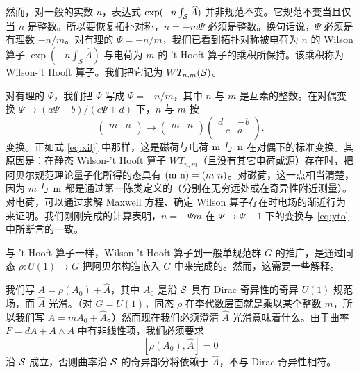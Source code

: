 然而，对一般的实数 $n$，表达式 $\exp(-n\int_{{\cal S}} \hat A)$ 并非规范不变。它规范不变当且仅当 $n$ 是整数。所以要恢复拓扑对称，$n=-m\Psi$ 必须是整数。换句话说，$\Psi$ 必须是有理数 $-n/m$。对有理的 $\Psi=-n/m$，我们已看到拓扑对称被电荷为 $n$ 的 Wilson 算子 $\exp(-n\int_S \hat A)$ 与电荷为 $m$ 的 't Hooft 算子的乘积所保持。该乘积称为 Wilson-'t Hooft 算子。我们把它记为 $WT_{n,m}({{\cal S}})$。

对有理的 $\Psi$，我们把 $\Psi$ 写成 $\Psi=-n/m$，其中 $n$ 与 $m$ 是互素的整数。在对偶变换 $\Psi\to (a\Psi+b)/(c\Psi+d)$ 下，$n$ 与 $m$ 按
\begin{equation*}
\tag*{(6.17)}
\left(\begin{matrix} m  & n \\\end{matrix}\right)\to  \left(\begin{matrix} m &
n\\\end{matrix}\right) \left(\begin{matrix} d & -b\\ -c & a \\\end{matrix}\right) .
\end{equation*}
 变换。正如式 \eqref{eq:xilj} 中那样，这是磁荷与电荷 $\eurm m$ 与 $\eurm n$ 在对偶下的标准变换。其原因是：在静态 Wilson-'t Hooft 算子 $WT_{n,m}$（且没有其它电荷或源）存在时，把阿贝尔规范理论量子化所得的态具有 $({\eurm m}~{\eurm n})=(m~n)$。对磁荷，这一点相当清楚，因为 $m$ 与 ${\eurm m}$ 都是通过第一陈类定义的（分别在无穷远处或在奇异性附近测量）。对电荷，可以通过求解 Maxwell 方程、确定 Wilson 算子存在时电场的渐近行为来证明。我们刚刚完成的计算表明，$n=-\Psi m$ 在 $\Psi\to\Psi+1$ 下的变换与 \eqref{eq:yto} 中所断言的一致。

\par{}

与 't Hooft 算子一样，Wilson-'t Hooft 算子到一般单规范群 $G$ 的推广，是通过同态 $\rho:U(1)\to G$ 把阿贝尔构造嵌入 $G$ 中来完成的。然而，这需要一些解释。

我们写 $A=\rho(A_0)+\hat A$，其中 $A_0$ 是沿 ${{\cal S}}$ 具有 Dirac 奇异性的奇异 $U(1)$ 规范场，而 $\hat A$ 光滑。（对 $G=U(1)$，同态 $\rho$ 在李代数层面就是乘以某个整数 $m$，所以我们写 $A=mA_0+\hat A$。）然而现在我们必须澄清 $\hat A$ 光滑意味着什么。由于曲率 $F=dA+A\wedge A$ 中有非线性项，我们必须要求
\setcounter{equation}{17}
\begin{equation}\label{eq:milfo}
[\rho(A_0),\hat A]=0
\end{equation}
 沿 ${{\cal S}}$ 成立，否则曲率沿 ${{\cal S}}$ 的奇异部分将依赖于 $\hat A$，不与 Dirac 奇异性相符。

